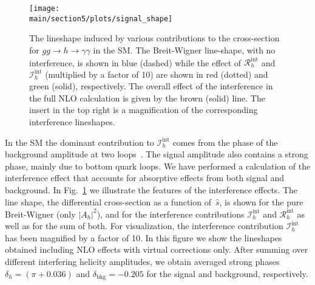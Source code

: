 \begin{figure}[htbp]
\begin{center}
\texttt{[image: \\main/section5/plots/signal\_shape]}
\caption{
The lineshape induced by various contributions to the cross-section for $gg \to h \to \gamma\gamma$ in the SM.
The Breit-Wigner line-shape, with no interference, is shown in blue (dashed) while the effect of $\mathcal{R}_h^\mathrm{int}$ and
$\mathcal{I}_h^\mathrm{int}$ (multiplied by a factor of 10) are shown in red (dotted) and green (solid), respectively.  The overall
effect of the interference in the full NLO calculation is given by the brown (solid) line. The insert in the top right is a magnification of the corresponding interference lineshapes.
}
\label{fig:sig_shape}
\end{center}
\vspace*{-0.6cm}
\end{figure}

In the SM the dominant contribution to $\mathcal{I}_h^\mathrm{int}$ comes from the phase of the background amplitude at two loops~\cite{Dicus:1987fk, Dixon:2003yb}. The signal amplitude also contains a
strong phase, mainly due to bottom quark loops. 
We have performed a calculation of the interference effect that accounts for absorptive effects from both signal and background.
In Fig.~\ref{fig:sig_shape} we illustrate the features of the interference effects.
The line shape, the differential cross-section as a function of~$\hat s$, is shown
for the pure Breit-Wigner (only $|A_h|^2$), and for the interference contributions $\mathcal{I}_h^\mathrm{int}$ and $\mathcal{R}_h^\mathrm{int}$ as well as for the sum of both. 
For visualization, the interference contribution $\mathcal{I}_h^\mathrm{int}$ has been magnified by a factor of 10. 
In this figure we show the lineshapes obtained including NLO effects with virtual corrections only. After summing over different interfering helicity amplitudes, we obtain averaged strong phases $\delta_h= (\pi+0.036)$ and $\delta_\mathrm{bkg}=-0.205$ for the signal and background, respectively.

